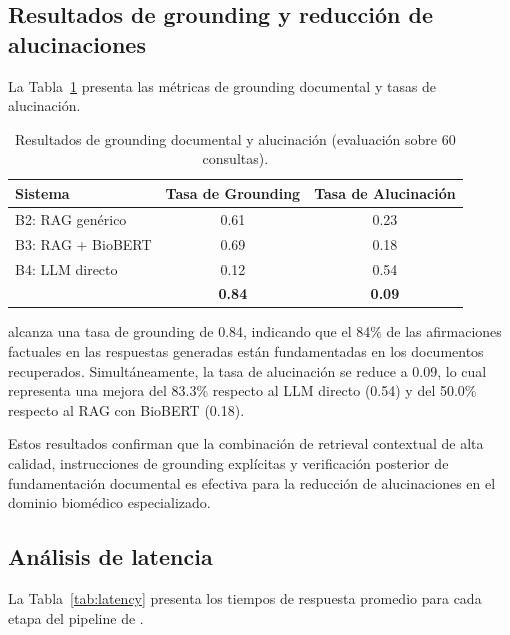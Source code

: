 \subsection{Resultados de grounding y reducción de alucinaciones}
\label{subsec:res_hallucination}

La Tabla~\ref{tab:grounding_results} presenta las métricas de grounding documental y tasas de alucinación.

\begin{table}[!t]
\centering
\caption{Resultados de grounding documental y alucinación (evaluación sobre 60 consultas).}
\label{tab:grounding_results}
\renewcommand{\arraystretch}{1.3}
\footnotesize
\begin{tabular}{l c c}
\toprule
\textbf{Sistema} & \textbf{Tasa de Grounding} & \textbf{Tasa de Alucinación} \\
\midrule
B2: RAG genérico   & 0.61 & 0.23 \\
B3: RAG + BioBERT  & 0.69 & 0.18 \\
B4: LLM directo    & 0.12 & 0.54 \\
\midrule
\textbf{\sirca{}}  & \textbf{0.84} & \textbf{0.09} \\
\bottomrule
\end{tabular}
\end{table}

\sirca{} alcanza una tasa de grounding de 0.84, indicando que el 84\% de las afirmaciones factuales en las respuestas generadas están fundamentadas en los documentos recuperados. Simultáneamente, la tasa de alucinación se reduce a 0.09, lo cual representa una mejora del 83.3\% respecto al LLM directo (0.54) y del 50.0\% respecto al RAG con BioBERT (0.18).

Estos resultados confirman que la combinación de retrieval contextual de alta calidad, instrucciones de grounding explícitas y verificación posterior de fundamentación documental es efectiva para la reducción de alucinaciones en el dominio biomédico especializado.

\subsection{Análisis de latencia}
\label{subsec:res_latency}

La Tabla~\ref{tab:latency} presenta los tiempos de respuesta promedio para cada etapa del pipeline de \sirca{}.

